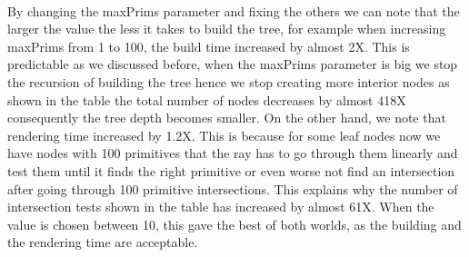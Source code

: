 \documentclass[11pt,a4paper]{article}
\begin{document}
\noindent
\\
By changing the maxPrims parameter and fixing the others we can note that the larger the value the less it takes to build the tree, for example when increasing maxPrims from  1 to 100, the build time increased by almost 2X. This is predictable as we discussed before, when the maxPrims parameter is big we stop the recursion of building the tree hence we stop creating more interior nodes as shown in the table the total number of nodes decreases by almost 418X consequently the tree depth becomes smaller. On the other hand, we note that rendering time increased by 1.2X. This is because for some leaf nodes now we have nodes with 100 primitives that the ray has to go through them linearly and test them until it finds the right primitive or even worse not find an intersection after going through 100 primitive intersections. This explains why the number of intersection tests shown in the table has increased by almost  61X. When the value is chosen between 10, this gave the best of both worlds, as the building and the rendering time are acceptable. 
\end{document}
